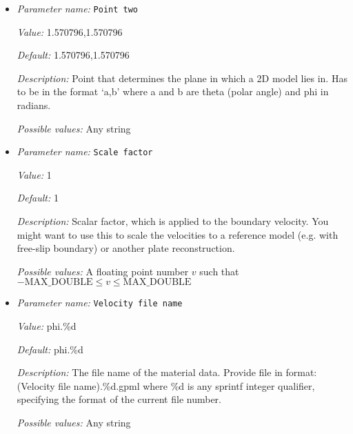 \begin{itemize}
{\it Value:} 1.570796,0.0


{\it Default:} 1.570796,0.0


{\it Description:} Point that determines the plane in which a 2D model lies in. Has to be in the format `a,b' where a and b are theta (polar angle)  and phi in radians.


{\it Possible values:} Any string
\item {\it Parameter name:} {\tt Point two}
\label{parameters:Boundary velocity model/GPlates model/Point two}


{\it Value:} 1.570796,1.570796


{\it Default:} 1.570796,1.570796


{\it Description:} Point that determines the plane in which a 2D model lies in. Has to be in the format `a,b' where a and b are theta (polar angle)  and phi in radians.


{\it Possible values:} Any string
\item {\it Parameter name:} {\tt Scale factor}
\label{parameters:Boundary velocity model/GPlates model/Scale factor}


{\it Value:} 1


{\it Default:} 1


{\it Description:} Scalar factor, which is applied to the boundary velocity. You might want to use this to scale the velocities to a reference model (e.g. with free-slip boundary) or another plate reconstruction.


{\it Possible values:} A floating point number $v$ such that $-\text{MAX\_DOUBLE} \leq v \leq \text{MAX\_DOUBLE}$
\item {\it Parameter name:} {\tt Velocity file name}
\label{parameters:Boundary velocity model/GPlates model/Velocity file name}


{\it Value:} phi.\%d


{\it Default:} phi.\%d


{\it Description:} The file name of the material data. Provide file in format: (Velocity file name).\%d.gpml where \%d is any sprintf integer qualifier, specifying the format of the current file number.


{\it Possible values:} Any string
\end{itemize}

